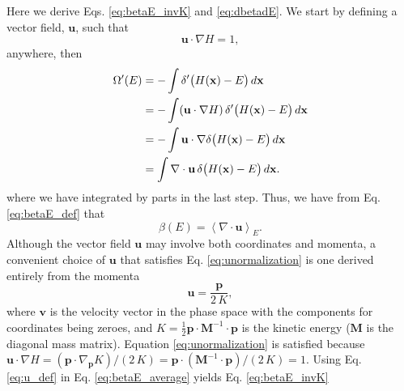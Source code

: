 \documentclass[reprint]{revtex4-1}
\begin{document}
Here we derive Eqs. \eqref{eq:betaE_invK} and \eqref{eq:dbetadE}.
We start by defining a vector field, $\mathbf u$,
such that
%
\begin{equation}
  \mathbf u \cdot \nabla H = 1
  ,
  \label{eq:unormalization}
\end{equation}
%
anywhere, then
%
\begin{align}
  \Omega'(E)
  &= -\int \delta'\bigl( H(\mathbf x) - E \bigr) \, d\mathbf x
     \notag \\
  &= -\int (\mathbf u \cdot \nabla H) \,
           \delta'\bigl( H(\mathbf x) - E \bigr) \, d\mathbf x
     \notag \\
  &= -\int \mathbf u \cdot
           \nabla \delta\bigl( H(\mathbf x) - E \bigr) \, d\mathbf x
     \notag \\
  &= \int \nabla \cdot \mathbf u \,
     \delta\bigl( H(\mathbf x) - E \bigr) \, d\mathbf x
  .
  \notag
\end{align}
%
where we have integrated by parts in the last step.
%
Thus, we have from Eq. \eqref{eq:betaE_def} that
%
\begin{equation}
  \beta(E)
  =
  \left\langle
    \nabla \cdot \mathbf u
  \right\rangle_E
  .
  \label{eq:betaE_average}
\end{equation}
%
Although the vector field $\mathbf u$ may involve both coordinates and momenta,
a convenient choice of $\mathbf u$ that satisfies
Eq. \eqref{eq:unormalization}
is one derived entirely from the momenta
%
\begin{equation}
  \mathbf u
  =
  \frac{ \mathbf p }
       {  2 \, K }
  ,
  \label{eq:u_def}
\end{equation}
where $\mathbf v$ is the velocity vector in the phase space
with the components for coordinates being zeroes,
and $K = \frac 1 2 \mathbf p \cdot \mathbf M^{-1} \cdot \mathbf p$
is the kinetic energy ($\mathbf M$ is the diagonal mass matrix).
%
Equation \eqref{eq:unormalization} is satisfied
because
$\mathbf u \cdot \nabla H
= (\mathbf p \cdot \nabla_{\mathbf p} K)/(2 \, K)
= \mathbf p \cdot (\mathbf M^{-1} \cdot \mathbf p) / (2 \, K) = 1$.
%
Using Eq. \eqref{eq:u_def} in Eq. \eqref{eq:betaE_average} yields Eq. \eqref{eq:betaE_invK}
\end{document}
